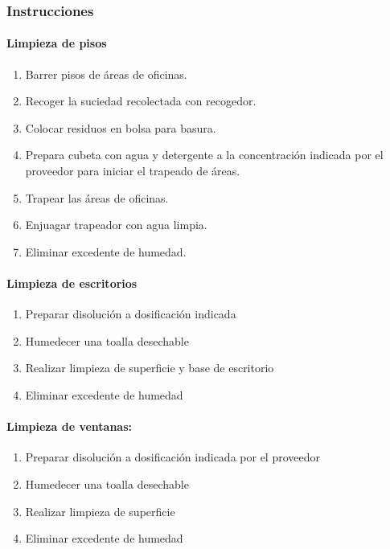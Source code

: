 \subsubsection{Instrucciones}
\paragraph{Limpieza de pisos}
\begin{enumerate}
	\item Barrer pisos de áreas de oficinas.
	\item Recoger la suciedad recolectada con recogedor.
	\item Colocar residuos en bolsa para basura.
	\item Prepara cubeta con agua y detergente a la concentración indicada por el proveedor para iniciar el trapeado de áreas.
	\item Trapear las áreas de oficinas.
	\item Enjuagar trapeador con agua limpia.
	\item Eliminar excedente de humedad.
\end{enumerate}

\paragraph{Limpieza de escritorios}

\begin{enumerate}
	\item Preparar disolución a dosificación indicada
	\item Humedecer una toalla desechable
	\item Realizar limpieza de superficie y base de escritorio
	\item Eliminar excedente de humedad
\end{enumerate}

\paragraph{Limpieza de ventanas:}
\begin{enumerate}
	\item Preparar disolución a dosificación indicada por el proveedor
	\item Humedecer una toalla desechable
	\item Realizar limpieza de superficie
	\item Eliminar excedente de humedad
\end{enumerate}

